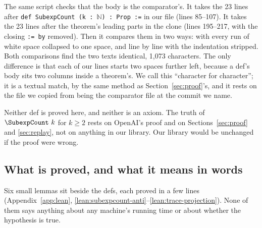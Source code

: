 The same script checks that the body is the comparator's. It takes the
23 lines after \texttt{def SubexpCount (k : }$\mathbb{N}$\texttt{) : Prop :=}
in our file (lines 85--107). It takes the 23 lines after the theorem's
leading parts in the clone (lines 195--217, with the closing \texttt{:= by}
removed). Then it compares them in two ways: with every run of white space
collapsed to one space, and line by line with the indentation stripped.
Both comparisons find the two texts identical, 1,073 characters. The
only difference is that each of our lines starts two spaces further
left, because a def's body sits two columns inside a theorem's. We call
this ``character for character''; it is a textual match, by the same
method as Section~\ref{sec:proof}'s, and it rests on the file we copied
from being the comparator file at the commit we name.

Neither def is proved here, and neither is an axiom. The truth of
\(\SubexpCount\ k\) for $k \ge 2$ rests on OpenAI's proof and on
Sections~\ref{sec:proof} and \ref{sec:replay}, not on anything in our
library. Our library would be unchanged if the proof were wrong.

\subsection{What is proved, and what it means in words}
\label{sec:lean-lemmas}

Six small lemmas sit beside the defs, each proved in a few lines
(Appendix~\ref{app:lean}, \ref{lean:subexpcount-anti}--\ref{lean:trace-projection}).
None of them says anything about any machine's running time or about
whether the hypothesis is true.

